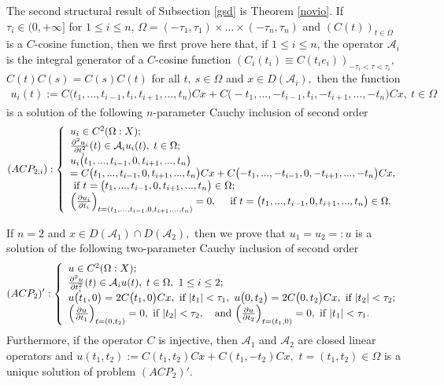 \documentclass{amsart}
\theoremstyle{definition}
\theoremstyle{remark}
\numberwithin{equation}{section}
\begin{document}
The second structural result of Subsection \ref{gsd} is Theorem \ref{novio}. If $\tau_{i}\in (0,+\infty]$ for $1\leq i \leq n$, $\Omega =(-\tau_{1},\tau_{1}) \times ... \times (-\tau_{n},\tau_{n})$ and $(C(t))_{t\in \Omega}$ 
is a $C$-cosine function, then we first prove here that, if $1\leq i\leq n$, the operator ${\mathcal A}_{i}$ is the integral generator of a $C$-cosine function
$(C_{i}(t_{i})\equiv C(t_{i}e_{i}))_{-\tau_{i}< \tau <\tau_{i}},$ $C(t)C(s)=C(s)C(t)$ for all $t,\ s\in \Omega$ and $x\in D({\mathcal A}_{i}),$ then the function 
\begin{align}\label{dfg}
u_{i}(t):=C\bigl(t_{1},...,t_{i-1},t_{i},t_{i+1},...,t_{n} \bigr)Cx+C\bigl(-t_{1},...,-t_{i-1},t_{i},-t_{i+1},...,-t_{n} \bigr)Cx,\ t\in \Omega
\end{align}
 is a solution of the following $n$-parameter Cauchy inclusion of second order
\[ (ACP_{2;i}): \left\{
\begin{array}{l}
u_{i}\in C^{2}(\Omega : X);\\ \frac{\partial ^{2}u_{i}}{\partial t_{i}^{2}}(t)\in {\mathcal A}_{i}u_{i}(t),\;t \in \Omega;\\ u_{i}
\bigl(t_{1},...,t_{i-1},0,t_{i+1},...,t_{n} \bigr)\\=C\bigl(t_{1},...,t_{i-1},0,t_{i+1},...,t_{n} \bigr)Cx+C\bigl(-t_{1},...,-t_{i-1},0,-t_{i+1},...,-t_{n} \bigr)Cx, \\ \mbox{ if }t= \bigl(t_{1},...,t_{i-1},0,t_{i+1},...,t_{n} \bigr) \in \Omega ;\\
\Bigl( \frac{\partial u_{i}}{\partial t_{i}}\Bigr)_{t=(t_{1},...,t_{i-1},0,t_{i+1},...,t_{n})}=0,\quad \mbox{ if }t=\bigl(t_{1},...,t_{i-1},0,t_{i+1},...,t_{n} \bigr) \in \Omega .
\end{array}
\right. \]

If $n=2$ and $x\in D({\mathcal A}_{1}) \cap D({\mathcal A}_{2}),$ then we prove that $u_{1}=u_{2}=:u$ is a solution of the following two-parameter Cauchy inclusion of second order
\[ (ACP_{2})': \left\{
\begin{array}{l}
u\in C^{2}(\Omega : X);\\ \frac{\partial ^{2}u}{\partial t_{i}^{2}}(t)\in {\mathcal A}_{i}u(t),\;t \in \Omega,\ 1\leq i\leq 2;\\ u\bigl(t_{1},0\bigr)=2C\bigl(t_{1},0\bigr)Cx,\mbox{ if }|t_{1}|<\tau_{1}, \ u\bigl(0,t_{2}\bigr)=2C\bigl(0,t_{2}\bigr)Cx,\mbox{ if }|t_{2}|<\tau_{2}; \\
\Bigl( \frac{\partial u}{\partial t_{1}}\Bigr)_{t=(0,t_{2})}=0,\mbox{ if }|t_{2}|<\tau_{2},\ \ \mbox{ and }\Bigl( \frac{\partial u}{\partial t_{2}}\Bigr)_{t=(t_{1},0)}=0,\mbox{ if }|t_{1}|<\tau_{1}.
\end{array}
\right. \]
Furthermore, if the operator $C$ is injective, then ${\mathcal A}_{1}$ and ${\mathcal A}_{2}$ are closed linear operators and $u(t_{1},t_{2}):=C(t_{1},t_{2})Cx+C(t_{1},-t_{2})Cx,$ $t=(t_{1},t_{2})\in \Omega$ is a unique solution of problem $(ACP_{2})'.$ 
\end{document}
